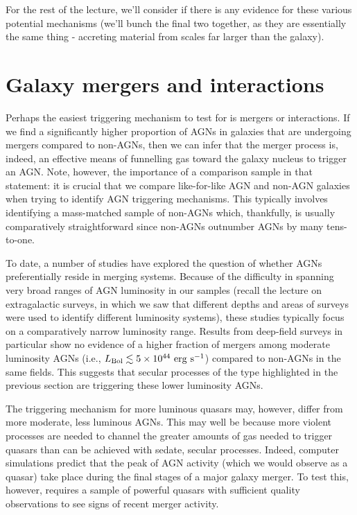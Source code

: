 \documentclass[11pt]{article}
\begin{document}
For the rest of the lecture, we'll consider if there is any evidence
for these various potential mechanisms (we'll bunch the final two
together, as they are essentially the same thing - accreting material
from scales far larger than the galaxy).

\section{Galaxy mergers and interactions}
Perhaps the easiest triggering mechanism to test for is mergers or
interactions. If we find a significantly higher proportion of AGNs in
galaxies that are undergoing mergers compared to non-AGNs, then we can
infer that the merger process is, indeed, an effective means of
funnelling gas toward the galaxy nucleus to trigger an AGN. Note,
however, the importance of a comparison sample in that statement: it
is crucial that we compare like-for-like AGN and non-AGN galaxies when
trying to identify AGN triggering mechanisms. This typically involves
identifying a mass-matched sample of non-AGNs which, thankfully, is
usually comparatively straightforward since non-AGNs outnumber AGNs by
many tens-to-one.

To date, a number of studies have explored the question of whether
AGNs preferentially reside in merging systems. Because of the
difficulty in spanning very broad ranges of AGN luminosity in our
samples (recall the lecture on extragalactic surveys, in which we saw
that different depths and areas of surveys were used to identify
different luminosity systems), these studies typically focus on a
comparatively narrow luminosity range. Results from deep-field surveys
in particular show no evidence of a higher fraction of mergers among
moderate luminosity AGNs (i.e.,
$L_{\rm Bol}\lesssim5\times10^{44}~{\rm erg~s^{-1}}$) compared to non-AGNs
in the same fields. This suggests that secular processes of the type
highlighted in the previous section are triggering these lower
luminosity AGNs.

The triggering mechanism for more luminous quasars may, however,
differ from more moderate, less luminous AGNs. This may well be
because more violent processes are needed to channel the greater
amounts of gas needed to trigger quasars than can be achieved with
sedate, secular processes. Indeed, computer simulations predict that
the peak of AGN activity (which we would observe as a quasar) take
place during the final stages of a major galaxy merger. To test this,
however, requires a sample of powerful quasars with sufficient quality
observations to see signs of recent merger activity.
\end{document}
